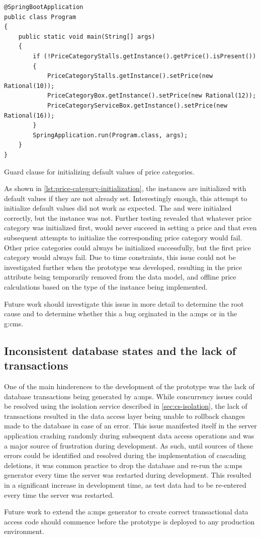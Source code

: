 \begin{listing}[H]
\begin{verbatim}
@SpringBootApplication
public class Program 
{
	public static void main(String[] args) 
    {
		if (!PriceCategoryStalls.getInstance().getPrice().isPresent())
		{
			PriceCategoryStalls.getInstance().setPrice(new Rational(10));
			PriceCategoryBox.getInstance().setPrice(new Rational(12));
			PriceCategoryServiceBox.getInstance().setPrice(new Rational(16));
		}
		SpringApplication.run(Program.class, args);
	}
}
\end{verbatim}
\caption{Guard clause for initializing default values of price categories.}
\label{lst:price-category-initialization}
\end{listing}

As shown in \cref{lst:price-category-initialization}, the  instances are initialized with default values if they are not already set. Interestingly enough, this attempt to initialize default values did not work as expected. The  and  were initialzed correctly, but the  instance was not. Further testing revealed that whatever price category was initialized first, would never succeed in setting a price and that even subsequent attempts to initialize the corresponding price category would fail. Other price categories could always be initialized successfully, but the first price category would always fail. Due to time constraints, this issue could not be investigated further when the prototype was developed, resulting in the price attribute being temporarily removed from the data model, and offline price calculations based on the type of the  instance being implemented. 

Future work should investigate this issue in more detail to determine the root cause and to determine whether this a bug orginated in the \gls{a:mps} or in the \gls{g:cms}.

\subsection{Inconsistent database states and the lack of transactions}

One of the main hinderences to the development of the prototype was the lack of database transactions being generated by \gls{a:mps}. While concurrency issues could be resolved using the isolation service described in \cref{sec:cs-isolation}, the lack of transactions resulted in the data access layer being unable to rollback changes made to the database in case of an error. This issue manifested itself in the server application crashing randomly during subsequent data access operations and was a major source of frustration during development. As such, until sources of these errors could be identified and resolved during the implementation of cascading deletions, it was common practice to drop the database and re-run the \gls{a:mps} generator every time the server was restarted during development. This resulted in a significant increase in development time, as test data had to be re-entered every time the server was restarted.

Future work to extend the \gls{a:mps} generator to create correct transactional data access code should commence before the prototype is deployed to any production environment.